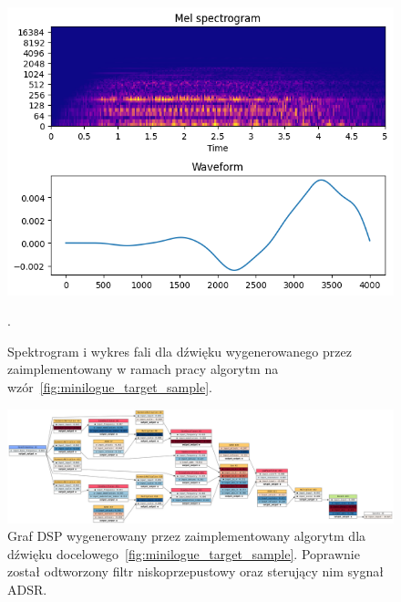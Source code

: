 \begin{figure}[H]
    \centering
    \includegraphics[width=0.7\linewidth]{rys06/evolved_minilogue.png}
    \caption{
      Spektrogram i wykres fali dla dźwięku wygenerowanego 
      przez zaimplementowany w ramach pracy algorytm na
      wzór~\ref{fig:minilogue_target_sample}.
    }\label{fig:evolved_minilogue_sample}.
\end{figure}


\begin{figure}
    \centering
    \includegraphics[angle=90,width=0.44\linewidth]{rys06/evolved_graph_minilogue.png}
    \caption{
      Graf DSP wygenerowany przez zaimplementowany algorytm
      dla dźwięku docelowego~\ref{fig:minilogue_target_sample}.
      Poprawnie został odtworzony filtr niskoprzepustowy oraz
      sterujący nim sygnał ADSR\@.
    }\label{fig:evolved_graph_op1}
\end{figure}

